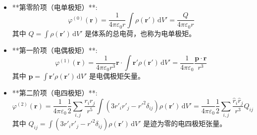 \documentclass[fontset=none]{ctexart}
\begin{document}
\begin{definition}[电多极矩]
\begin{itemize}
    \item **第零阶项（电单极矩）**:
    \begin{equation}
        \varphi^{(0)}(\bm{r}) = \frac{1}{4\pi\varepsilon_0 r} \int \rho(\bm{r'}) \, \mathrm{d}V' = \frac{Q}{4\pi\varepsilon_0 r}
    \end{equation}
    其中 $Q = \int \rho(\bm{r'}) \, \mathrm{d}V'$ 是体系的总电荷，也称为电单极矩。
    
    \item **第一阶项（电偶极矩）**:
    \begin{equation}
        \varphi^{(1)}(\bm{r}) = \frac{1}{4\pi\varepsilon_0 r^3} \bm{r} \cdot \int \bm{r'} \rho(\bm{r'}) \, \mathrm{d}V' = \frac{1}{4\pi\varepsilon_0} \frac{\bm{p} \cdot \bm{r}}{r^3}
    \end{equation}
    其中 $\bm{p} = \int \bm{r'} \rho(\bm{r'}) \, \mathrm{d}V'$ 是电偶极矩矢量。
    
    \item **第二阶项（电四极矩）**:
    \begin{equation}
        \varphi^{(2)}(\bm{r}) = \frac{1}{4\pi\varepsilon_0} \frac{1}{2} \sum_{i,j} \frac{r_i r_j}{r^5} \int (3r'_i r'_j - r'^2\delta_{ij})\rho(\bm{r'}) \, \mathrm{d}V' = \frac{1}{4\pi\varepsilon_0} \frac{1}{2} \sum_{i,j} \frac{\hat{r}_i \hat{r}_j}{r^3} Q_{ij}
    \end{equation}
    其中 $Q_{ij} = \int (3r'_i r'_j - r'^2\delta_{ij})\rho(\bm{r'}) \, \mathrm{d}V'$ 是迹为零的电四极矩张量。
\end{itemize}
\end{definition}
\end{document}

